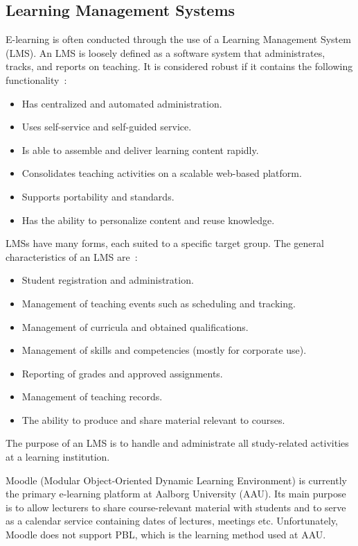 \subsection{Learning Management Systems}
\label{sub:lms}
E-learning is often conducted through the use of a Learning Management System (LMS). 
An LMS is loosely defined as a software system that administrates, tracks, and reports on teaching. 
It is considered robust if it contains the following functionality~\citep{Ellis09}:

\begin{itemize}
	\item Has centralized and automated administration.
	\item Uses self-service and self-guided service.
	\item Is able to assemble and deliver learning content rapidly.
	\item Consolidates teaching activities on a scalable web-based platform.
	\item Supports portability and standards.
	\item Has the ability to personalize content and reuse knowledge.
\end{itemize}

LMSs have many forms, each suited to a specific target group.
The general characteristics of an LMS are~\citep{Kerschenbaum}:

\begin{itemize}
	\item Student registration and administration.
	\item Management of teaching events such as scheduling and tracking.
	\item Management of curricula and obtained qualifications.
	\item Management of skills and competencies (mostly for corporate use).
	\item Reporting of grades and approved assignments.
	\item Management of teaching records.
	\item The ability to produce and share material relevant to courses.
\end{itemize}

The purpose of an LMS is to handle and administrate all study-related activities at a learning institution.

Moodle (Modular Object-Oriented Dynamic Learning Environment) \citep{moodle} is currently the primary e-learning platform at Aalborg University (AAU). 
Its main purpose is to allow lecturers to share course-relevant material with students and to serve as a calendar service containing dates of lectures, meetings etc. 
Unfortunately, Moodle does not support PBL, which is the learning method used at AAU.

